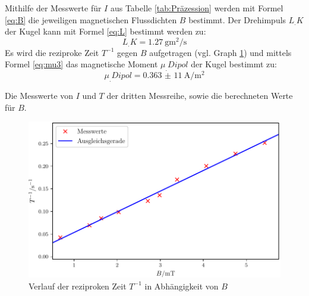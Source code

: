 Mithilfe der Messwerte für $I$ aus Tabelle \ref{tab:Präzession} werden mit Formel \eqref{eq:B} die jeweiligen magnetischen Flussdichten $B$ bestimmt. Der Drehimpuls $L_.K$ der Kugel kann mit Formel \eqref{eq:L} bestimmt werden zu:
\begin{equation*}
L_.K = \SI{1,27}{\gram\metre\squared\per\second}
\end{equation*}
Es wird die reziproke Zeit $T^{-1}$ gegen $B$ aufgetragen (vgl. Graph \ref{fig:Präzession}) und mittels Formel \eqref{eq:mu3} das magnetische Moment $\mu_.{Dipol}$ der Kugel bestimmt zu:
\begin{equation*}
\mu_.{Dipol} = \SI{0,363(11)}{\ampere\per\metre\squared}
\end{equation*}  
\begin{table}
  	\centering
  	\caption{Die Messwerte von $I$ und $T$ der dritten Messreihe, sowie die berechneten Werte für $B$.}
  	\label{tab:Präzession}
\end{table}
\begin{figure}
	\centering
	\includegraphics[scale = 1,keepaspectratio]
	{content/images/Praezession.pdf}
	\caption{Verlauf der reziproken Zeit $T^{-1}$ in Abhängigkeit von $B$}
	\label{fig:Präzession}
\end{figure}